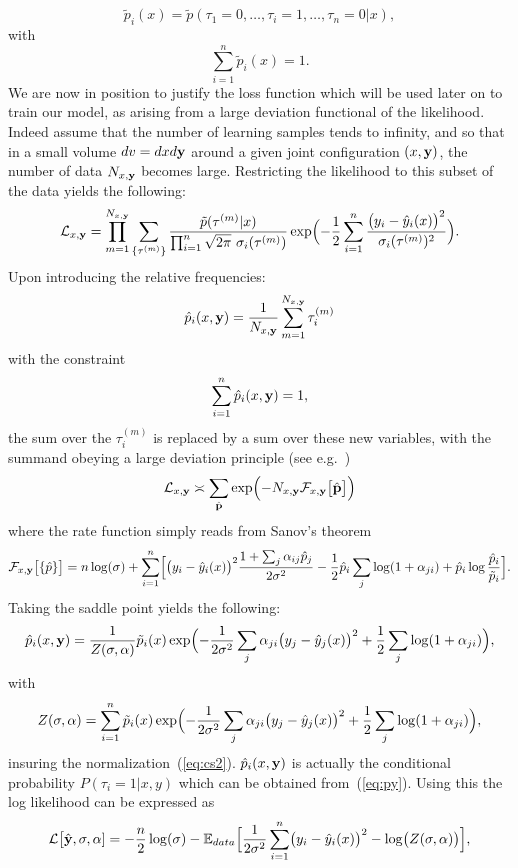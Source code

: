 \documentclass[envcountsect,runningheads]{llncs}
\theoremstyle{etoile}
\begin{document}
\[
\tilde p_i(x) = \tilde p(\tau_1=0,\ldots,\tau_i=1,\ldots,\tau_n=0\vert x),
\]
with 
\[
\sum_{i=1}^n \tilde p_i(x) = 1.
\]
We are now in position to justify the loss function which will be used later on to train our model, as arising from a large deviation functional of the likelihood. Indeed assume that the number of learning samples tends to infinity, and so that in a small volume $dv = dxd\bf y$ around a given  joint configuration $(x,\bf y)$, the number of data $N_{x,\bf y}$ becomes large. Restricting the likelihood to this subset of the data yields the following:
\[
{\cal L}_{x,{\bf y}} = \prod_{m=1}^{N_{x,{\bf y}}} \sum_{\{\tau^{(m)}\}} 
\frac{\tilde p(\tau^{(m)}\vert x)}{\prod_{i=1}^n\sqrt{2\pi}\ \sigma_i(\tau^{(m)})}
\exp\Bigl(-\frac{1}{2}\sum_{i=1}^n\frac{\bigl(y_i-\hat y_i(x)\bigr)^2}{\sigma_i(\tau^{(m)})^2}\Bigr).
\]
Upon introducing the relative frequencies:
\[
\hat p_i(x,{\bf y}) = \frac{1}{N_{x,{\bf y}}}\sum_{m=1}^{N_{x,{\bf y}}} \tau_i^{(m)} 
\]
with the constraint
\begin{equation}\label{eq:cs2}
\sum_{i=1}^n \hat p_i(x,{\bf y}) = 1,
\end{equation}
the sum over the $\tau_i^{(m)}$ is replaced by a sum over these new variables, with the summand obeying a large deviation principle (see e.g.~\cite{Touchette})
\[
{\cal L}_{x,{\bf y}} \asymp \sum_{\hat {\bf p}} 
\exp\Bigl(-N_{x,{\bf y}} {\cal F}_{x,{\bf y}}\bigl[\hat {\bf p}\bigr]\Bigr)
\]
where the rate function simply reads from Sanov's theorem
\[
{\cal F}_{x,{\bf y}}\bigl[\{\hat p\}\bigr] = n\log(\sigma)+
\sum_{i=1}^n\Bigl[\bigl(y_i-\hat y_i(x)\bigr)^2\frac{1+\sum_j\alpha_{ij}\hat p_j}{2\sigma^2}
-\frac{1}{2}\hat p_i\sum_j\log(1+\alpha_{ji})+\hat p_i\log\frac{\hat p_i}{\tilde p_i}\Bigr].
\]
Taking the saddle point yields the following:
\begin{equation}\label{eq:hatpi}
\hat p_i(x,{\bf y}) = \frac{1}{Z(\sigma,{\bf \alpha})}\tilde p_i(x)\exp\Bigl(-\frac{1}{2\sigma^2}\sum_j\alpha_{ji}\bigl(y_j-\hat y_j(x)\bigr)^2+\frac{1}{2}\sum_j\log(1+\alpha_{ji})\Bigr),
\end{equation}
with
\[
Z(\sigma,{\bf \alpha}) = \sum_{i=1}^n\tilde p_i(x)\exp\Bigl(-\frac{1}{2\sigma^2}\sum_j\alpha_{ji}\bigl(y_j-\hat y_j(x)\bigr)^2+\frac{1}{2}\sum_j\log(1+\alpha_{ji})\Bigr),
\]
insuring the normalization~(\ref{eq:cs2}). $\hat p_i(x,{\bf y})$ is actually the conditional probability $P(\tau_i=1\vert x,y)$ which can be obtained from~(\ref{eq:py}).
Using this the log likelihood can be expressed as
\[
  {\cal L}\bigl[\hat {\bf y},\sigma,{\bf \alpha}] = -\frac{n}{2}\log(\sigma)-{\mathbb E}_{data}\Bigl[\frac{1}{2\sigma^2}\sum_{i=1}^n\bigl(y_i-\hat y_i(x)\bigr)^2
    -\log\bigl(Z(\sigma,{\bf \alpha})\bigr)\Bigr],
\]
\end{document}

